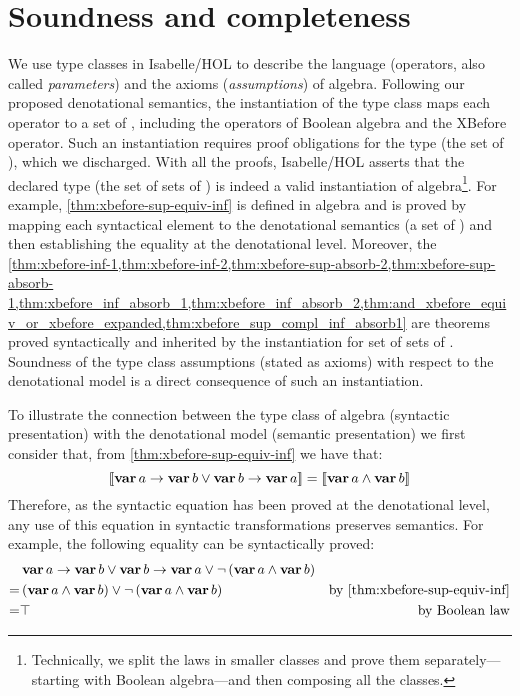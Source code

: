 \section{Soundness and completeness}
\label{sec:algebras-soundness-and-completeness}

We use type classes in Isabelle/HOL to describe the language (operators, also called \emph{parameters}) and the axioms (\emph{assumptions}) of \ac{algebra}.
%
Following our proposed denotational semantics, the instantiation of the type class maps each operator to a set of \distinctlists, including the operators of Boolean algebra and the \ac{XBefore} operator.
%
Such an instantiation requires proof obligations for the type (the set of \distinctlists), which we discharged.
%
With all the proofs, Isabelle/HOL asserts that the declared type (the set of sets of \distinctlists) is indeed a valid instantiation of \ac{algebra}\footnote{
Technically, we split the laws in smaller classes and prove them separately---starting with Boolean algebra---and then composing all the classes.}.
%
For example, \cref{thm:xbefore-sup-equiv-inf} is defined in \ac{algebra} and is proved by mapping each syntactical element to the denotational semantics (a set of \distinctlists) and then establishing the equality at the denotational level.
%
Moreover, the \cref{thm:xbefore-inf-1,thm:xbefore-inf-2,thm:xbefore-sup-absorb-2,thm:xbefore-sup-absorb-1,thm:xbefore_inf_absorb_1,thm:xbefore_inf_absorb_2,thm:and_xbefore_equiv_or_xbefore_expanded,thm:xbefore_sup_compl_inf_absorb1} are theorems proved syntactically and inherited by the instantiation for set of sets of \distinctlists.
Soundness of the type class assumptions (stated as axioms) with respect to the denotational model is a direct consequence of such an instantiation. 

To illustrate the connection between the type class of \ac{algebra} (syntactic presentation) with the denotational model (semantic presentation) we first consider that, from \cref{thm:xbefore-sup-equiv-inf} we have that:
%
\[
\left[\!\left[\operatorname{\mathbf{var}} a \rightarrow \operatorname{\mathbf{var}} b \lor \operatorname{\mathbf{var}} b \rightarrow \operatorname{\mathbf{var}} a\right]\!\right] =
\left[\!\left[\operatorname{\mathbf{var}} a \land \operatorname{\mathbf{var}} b\right]\!\right]
\]
%
Therefore, as the syntactic equation has been proved at the denotational level, any use of this equation in syntactic transformations preserves semantics. 
For example, the following equality can be syntactically proved:
%
\begin{align*}
& \xbefore{\var{a}}{\var{b}} \lor 
	\xbefore{\var{b}}{\var{a}} \lor 
	\lnot \left(\var{a} \land \var{b}\right)\nonumber\\
= & \left(\var{a} \land \var{b}\right) \lor 
	\lnot \left(\var{a} \land \var{b} \right) 
	& \text{by \cref{thm:xbefore-sup-equiv-inf}}\nonumber\\
= & \top & \text{by Boolean law}
\end{align*}

